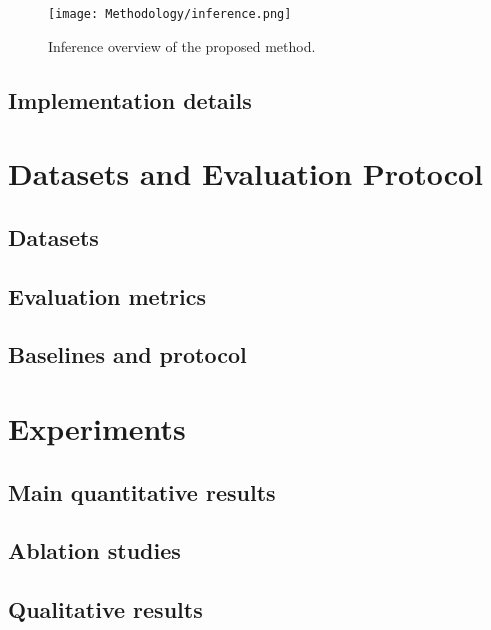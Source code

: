 \documentclass[journal]{IEEEtran}
\begin{document}
\begin{figure*}[!t]
    \centering
    \texttt{[image: Methodology/inference.png]}
    \caption{Inference overview of the proposed method.}
    \label{fig:inference_overview}
\end{figure*}

\subsection{Implementation details}

\section{Datasets and Evaluation Protocol}
\label{sec:data}
\subsection{Datasets}

\subsection{Evaluation metrics}

\subsection{Baselines and protocol}

\section{Experiments}
\label{sec:exp}
\subsection{Main quantitative results}

\subsection{Ablation studies}

\subsection{Qualitative results}
\end{document}
